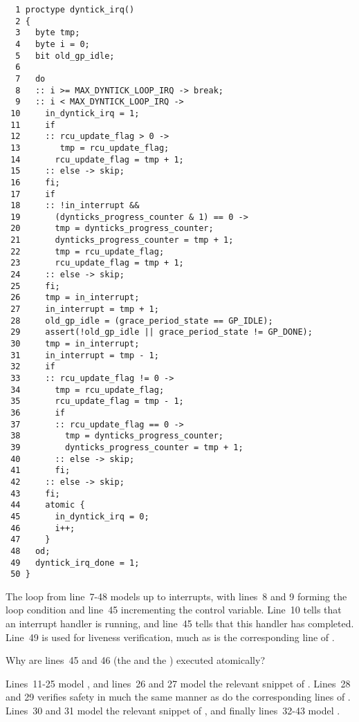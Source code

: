 { \scriptsize
\begin{verbatim}
  1 proctype dyntick_irq()
  2 {
  3   byte tmp;
  4   byte i = 0;
  5   bit old_gp_idle;
  6
  7   do
  8   :: i >= MAX_DYNTICK_LOOP_IRQ -> break;
  9   :: i < MAX_DYNTICK_LOOP_IRQ ->
 10     in_dyntick_irq = 1;
 11     if
 12     :: rcu_update_flag > 0 ->
 13        tmp = rcu_update_flag;
 14       rcu_update_flag = tmp + 1;
 15     :: else -> skip;
 16     fi;
 17     if
 18     :: !in_interrupt &&
 19       (dynticks_progress_counter & 1) == 0 ->
 20       tmp = dynticks_progress_counter;
 21       dynticks_progress_counter = tmp + 1;
 22       tmp = rcu_update_flag;
 23       rcu_update_flag = tmp + 1;
 24     :: else -> skip;
 25     fi;
 26     tmp = in_interrupt;
 27     in_interrupt = tmp + 1;
 28     old_gp_idle = (grace_period_state == GP_IDLE);
 29     assert(!old_gp_idle || grace_period_state != GP_DONE);
 30     tmp = in_interrupt;
 31     in_interrupt = tmp - 1;
 32     if
 33     :: rcu_update_flag != 0 ->
 34       tmp = rcu_update_flag;
 35       rcu_update_flag = tmp - 1;
 36       if
 37       :: rcu_update_flag == 0 ->
 38         tmp = dynticks_progress_counter;
 39         dynticks_progress_counter = tmp + 1;
 40       :: else -> skip;
 41       fi;
 42     :: else -> skip;
 43     fi;
 44     atomic {
 45       in_dyntick_irq = 0;
 46       i++;
 47     }
 48   od;
 49   dyntick_irq_done = 1;
 50 }
\end{verbatim}
}

The loop from line~7-48 models up to 
interrupts, with lines~8 and 9 forming the loop condition and line~45
incrementing the control variable.
Line~10 tells  that an interrupt handler
is running, and line~45 tells  that this
handler has completed.
Line~49 is used for liveness verification, much as is the corresponding
line of .

\QuickQuiz{}
	Why are lines~45 and 46 (the 
	and the ) executed atomically?
 \QuickQuizEnd

Lines~11-25 model , and
lines~26 and 27 model the relevant snippet of .
Lines~28 and 29 verifies safety in much the same manner as do the
corresponding lines of .
Lines~30 and 31 model the relevant snippet of ,
and finally lines~32-43 model .


